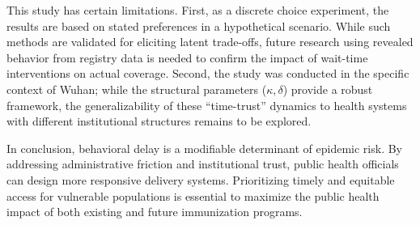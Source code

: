 This study has certain limitations. First, as a discrete choice experiment, the results are based on stated preferences in a hypothetical scenario. While such methods are validated for eliciting latent trade-offs, future research using revealed behavior from registry data is needed to confirm the impact of wait-time interventions on actual coverage. Second, the study was conducted in the specific context of Wuhan; while the structural parameters ($\kappa, \delta$) provide a robust framework, the generalizability of these ``time-trust'' dynamics to health systems with different institutional structures remains to be explored.

In conclusion, behavioral delay is a modifiable determinant of epidemic risk. By addressing administrative friction and institutional trust, public health officials can design more responsive delivery systems. Prioritizing timely and equitable access for vulnerable populations is essential to maximize the public health impact of both existing and future immunization programs.

